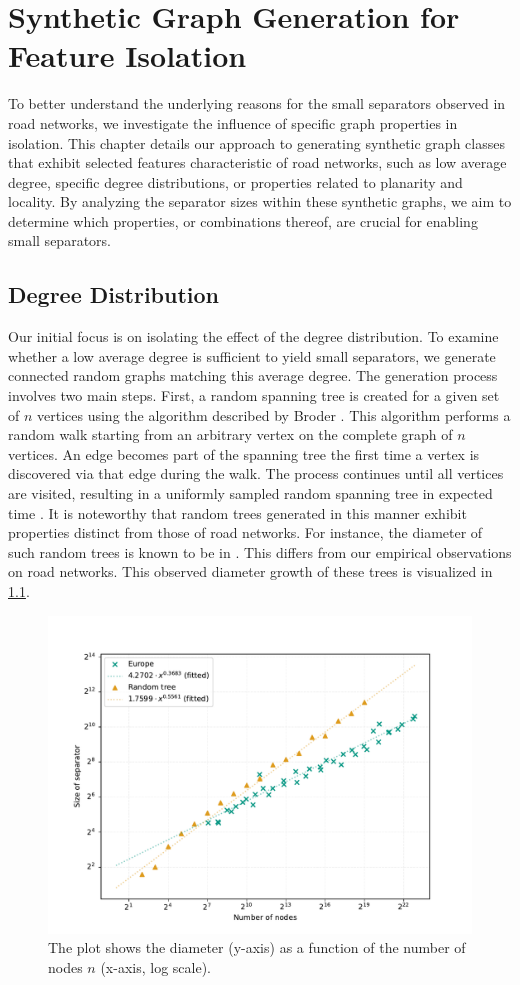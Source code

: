 \chapter{Synthetic Graph Generation for Feature Isolation}
\label{ch:synthetic_generation}

To better understand the underlying reasons for the small separators observed in road networks, we investigate the influence of specific graph properties in isolation.
This chapter details our approach to generating synthetic graph classes that exhibit selected features characteristic of road networks, such as low average degree, specific degree distributions, or properties related to planarity and locality.
By analyzing the separator sizes within these synthetic graphs, we aim to determine which properties, or combinations thereof, are crucial for enabling small separators.

\section{Degree Distribution}

Our initial focus is on isolating the effect of the degree distribution.
To examine whether a low average degree is sufficient to yield small separators, we generate connected random graphs matching this average degree.
The generation process involves two main steps.
First, a random spanning tree is created for a given set of \(n\) vertices using the algorithm described by Broder \cite{broder_generating_1989}.
This algorithm performs a random walk starting from an arbitrary vertex on the complete graph of \(n\) vertices.
An edge becomes part of the spanning tree the first time a vertex is discovered via that edge during the walk.
The process continues until all vertices are visited, resulting in a uniformly sampled random spanning tree in expected time .
It is noteworthy that random trees generated in this manner exhibit properties distinct from those of road networks.
For instance, the diameter of such random trees is known to be in  \cite{chlamtac_tree-based_1987}.
This differs from our empirical observations on road networks.
This observed diameter growth of these trees is visualized in \cref{fig:diameter_karlsruhe}.

\begin{figure}[tbhp]
	\centering
	\includegraphics[width=0.6\linewidth]{graphics/diameters.pdf}
	\caption{The plot shows the diameter (y-axis) as a function of the number of nodes \(n\) (x-axis, log scale).}
	\label{fig:diameter_karlsruhe}
\end{figure}


